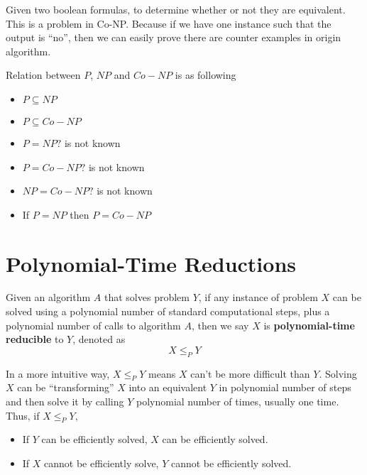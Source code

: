 			\begin{example}
				Given two boolean formulas, to determine whether or not they are equivalent. This is a problem in Co-NP. Because if we have one instance such that the output is ``no'', then we can easily prove there are counter examples in origin algorithm.
			\end{example}


			Relation between $P$, $NP$ and $Co-NP$ is as following
			\begin{itemize}
				\item $P \subseteq NP$
				\item $P \subseteq Co-NP$
				\item $P = NP?$ is not known
				\item $P = Co-NP?$ is not known
				\item $NP = Co-NP?$ is not known
				\item If $P = NP$ then $P = Co-NP$
			\end{itemize}

		\section{Polynomial-Time Reductions}
			\begin{definition}
				Given an algorithm $A$ that solves problem $Y$, if any instance of problem $X$ can be solved using a polynomial number of standard computational steps, plus a polynomial number of calls to algorithm $A$, then we say $X$ is \textbf{polynomial-time reducible} to $Y$, denoted as 
				\begin{equation}
					X \le_P Y
				\end{equation}
			\end{definition}

			In a more intuitive way, $X \le_P Y$ means $X$ can't be more difficult than $Y$. Solving $X$ can be ``transforming'' $X$ into an equivalent $Y$ in polynomial number of steps and then solve it by calling $Y$ polynomial number of times, usually one time. Thus, if $X \le_P Y$,
			\begin{itemize}
				\item If $Y$ can be efficiently solved, $X$ can be efficiently solved.
				\item If $X$ cannot be efficiently solve, $Y$ cannot be efficiently solved.
			\end{itemize}


